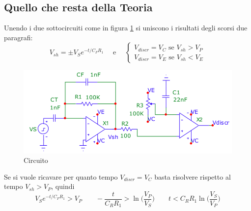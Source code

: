 \documentclass{article}
\begin{document}
		\subsection{Quello che resta della Teoria}
			Unendo i due sottocircuiti come in figura \ref{fig:circ} si uniscono i risultati degli scorsi due paragrafi:
			\begin{equation}
				V_{sh}=\pm V_Se^{-t/C_FR_1}\quad \textrm{ e }\quad 
				\begin{cases}
					V_{discr}=V_C \textrm{ se } V_{sh}>V_P\\
					V_{discr}=V_E \textrm{ se } V_{sh}<V_E
				\end{cases}
			\end{equation}
			\begin{figure}
				\label{fig:circ}
				\centering
				\includegraphics[width=120mm]{immagini/circa.png}
				\caption{Circuito}
			\end{figure}
			Se si vuole ricavare per quanto tempo $V_{discr}=V_C$ basta risolvere rispetto al tempo $V_{sh}>V_P$, quindi
			\begin{equation}
				V_Se^{-t/C_FR_1}>V_P\qquad-\frac{t}{C_RR_1}>\ln \bigg(\frac{V_P}{V_S}\bigg)\qquad t<C_RR_1\ln \bigg(\frac{V_S}{V_P}\bigg)
			\end{equation}
\end{document}

